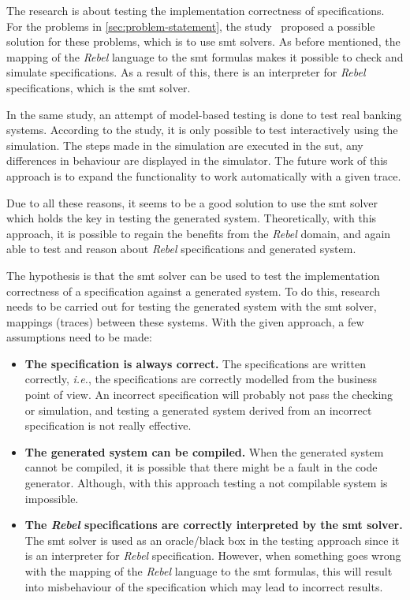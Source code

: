 The research is about testing the implementation correctness of specifications.
For the problems in \autoref{sec:problem-statement}, the
study~\cite[p.3]{stoelcase} proposed a possible solution for these problems,
which is to use \gls{smt} solvers. As before mentioned, the mapping of the \textit{Rebel}
language to the \gls{smt} formulas makes it possible to check and simulate
specifications. As a result of this, there is an interpreter for \textit{Rebel}
specifications, which is the \gls{smt}
solver.~\cite[p.5]{stoel_storm_vinju_bosman_2016}

In the same study,
an attempt of model-based testing is done to test real banking systems.
According to the study, it is only possible to test interactively using the
simulation. The steps made in the simulation are executed in the \gls{sut}, any
differences in behaviour are displayed in the simulator. The future work of this
approach is to expand the functionality to work automatically with a given
trace.

Due to all these reasons, it seems to be a good solution to use the \gls{smt}
solver which holds the key in testing the generated system. Theoretically, with
this approach, it is possible to regain the benefits from the \textit{Rebel} domain, and
again able to test and reason about \textit{Rebel} specifications and generated system.

The hypothesis is that the \gls{smt} solver can be used to test the implementation
correctness of a specification against a generated system. To do this,
research needs to be carried out for testing the generated system
with the \gls{smt} solver, mappings (traces) between these systems. With the given approach, a
few assumptions need to be made:

\begin{itemize}
\item \textbf{The specification is always correct.}
The specifications are written correctly, \textit{i.e.}, the specifications are
correctly modelled from the business point of view. An incorrect specification
will probably not pass the checking or simulation, and testing a generated
system derived from an incorrect specification is not really effective.
\item \textbf{The generated system can be compiled.} When the generated
system cannot be compiled, it is possible that there might be a fault in the
code generator. Although, with this approach testing a not compilable system is
impossible.
\item \textbf{The \textit{Rebel} specifications are correctly interpreted by the \gls{smt}
solver.} The \gls{smt} solver is used as an oracle/black box in the testing approach
since it is an interpreter for \textit{Rebel} specification. However, when
something goes wrong with the mapping of the \textit{Rebel} language to the \gls{smt}
formulas, this will result into misbehaviour of the specification which may lead
to incorrect results.
\end{itemize}

